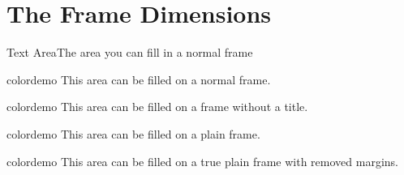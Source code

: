 \section{The Frame Dimensions}
%
%
%
%
\begin{frame}[t]{Text Area}{The area you can fill in a normal frame}

\begin{beamercolorbox}[dp=0pt,sep=0em,wd=\textwidth,ht=\FrameHeight,center]{colordemo}%
This area can be filled on a normal frame.
\vspace{5cm}%
\end{beamercolorbox}%
\end{frame}
%
%
%
\begin{frame}

\begin{beamercolorbox}[dp=0pt,sep=0em,
					   wd=\textwidth,
					   ht=\dimexpr\FrameHeight+\TitleHeight+4mm,center]{colordemo}%
This area can be filled on a frame without a title.
\vspace{5cm}%
\end{beamercolorbox}%
\end{frame}
%
%
%
%
%
\begin{frame}[plain]
\begin{beamercolorbox}[dp=0pt,sep=0em,wd=\textwidth,ht=\paperheight,center]{colordemo}%
This area can be filled on a plain frame.
\vspace{5cm}%
\end{beamercolorbox}%
\end{frame}
%
%
%
%
%
\begin{trueplainframe}
\begin{beamercolorbox}[dp=0pt,sep=0em,wd=\textwidth,ht=\paperheight,center]{colordemo}%
This area can be filled on a true plain frame with removed margins.
\vspace{5cm}%
\end{beamercolorbox}%
\end{trueplainframe}
%
%
%
%
%
